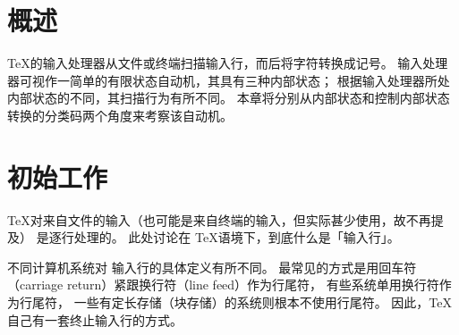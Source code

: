 \documentclass{book}
\begin{document}
\section{概述}

\TeX 的输入处理器从文件或终端扫描输入行，而后将字符转换成记号。
输入处理器可视作一简单的有限状态自动机，其具有三种内部状态；
根据输入处理器所处内部状态的不同，其扫描行为有所不同。
本章将分别从内部状态和控制内部状态转换的分类码两个角度来考察该自动机。

\section{初始工作}

\TeX 对来自文件的输入（也可能是来自终端的输入，但实际甚少使用，故不再提及）
是逐行处理的。
此处讨论在 \TeX 语境下，到底什么是「输入行」。

不同计算机系统对%
%
输入行的具体定义有所不同。
最常见的方式是用回车符（carriage return）紧跟换行符（line feed）作为行尾符，
有些系统单用换行符作为行尾符，
一些有定长存储（块存储）的系统则根本不使用行尾符。
因此，\TeX 自己有一套终止输入行的方式。
\end{document}

